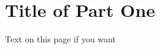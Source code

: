 \documentclass[12pt,oneside]{memoir}	%
\begin{document}
%
%
\mainmatter				%
\renewcommand{\arraystretch}{0.65}	%
\pagestyle{simple}						%
\renewcommand{\afterpartskip}{\vfil \vskip2\onelineskip}	%
\part{Title of Part One}
Text on this page if you want
	
	
\end{document}

